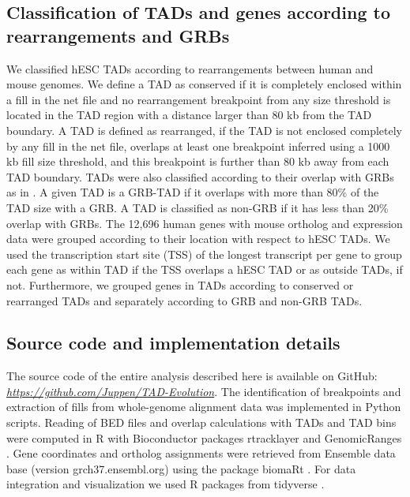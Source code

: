 \documentclass[a4paper,twoside=true,openright,parskip=full,chapterprefix=true,11pt,headings=normal,bibliography=totoc,listof=totoc,titlepage=on,captions=tableabove,draft=false]{scrreprt}
\theoremstyle{definition}
\theoremstyle{definition}
\theoremstyle{definition}
\theoremstyle{remark}
\begin{document}
\hypertarget{classification-of-tads-and-genes-according-to-rearrangements-and-grbs}{%
\subsection{Classification of TADs and genes according to rearrangements
and
GRBs}\label{classification-of-tads-and-genes-according-to-rearrangements-and-grbs}}

We classified hESC TADs according to rearrangements between human and
mouse genomes. We define a TAD as conserved if it is completely enclosed
within a fill in the net file and no rearrangement breakpoint from any
size threshold is located in the TAD region with a distance larger than
80 kb from the TAD boundary. A TAD is defined as rearranged, if the TAD
is not enclosed completely by any fill in the net file, overlaps at
least one breakpoint inferred using a 1000 kb fill size threshold, and
this breakpoint is further than 80 kb away from each TAD boundary. TADs
were also classified according to their overlap with GRBs as in
\citep{Harmston2017}. A given TAD is a GRB-TAD if it overlaps with more
than 80\% of the TAD size with a GRB. A TAD is classified as non-GRB if
it has less than 20\% overlap with GRBs. The 12,696 human genes with
mouse ortholog and expression data were grouped according to their
location with respect to hESC TADs. We used the transcription start site
(TSS) of the longest transcript per gene to group each gene as within
TAD if the TSS overlaps a hESC TAD or as outside TADs, if not.
Furthermore, we grouped genes in TADs according to conserved or
rearranged TADs and separately according to GRB and non-GRB TADs.

\hypertarget{source-code-and-implementation-details}{%
\subsection{Source code and implementation
details}\label{source-code-and-implementation-details}}

The source code of the entire analysis described here is available on
GitHub:
\href{https://github.com/Juppen/TAD-Evolution}{\emph{https://github.com/Juppen/TAD-Evolution}}.
The identification of breakpoints and extraction of fills from
whole-genome alignment data was implemented in Python scripts. Reading
of BED files and overlap calculations with TADs and TAD bins were
computed in R with Bioconductor \citep{Huber2015} packages rtracklayer
\citep{Lawrence2009} and GenomicRanges \citep{Lawrence2013}. Gene
coordinates and ortholog assignments were retrieved from Ensemble data
base (version grch37.ensembl.org) using the package biomaRt
\citep{Durinck2009}. For data integration and visualization we used R
packages from tidyverse \citep{Wickham2017}.
\end{document}
